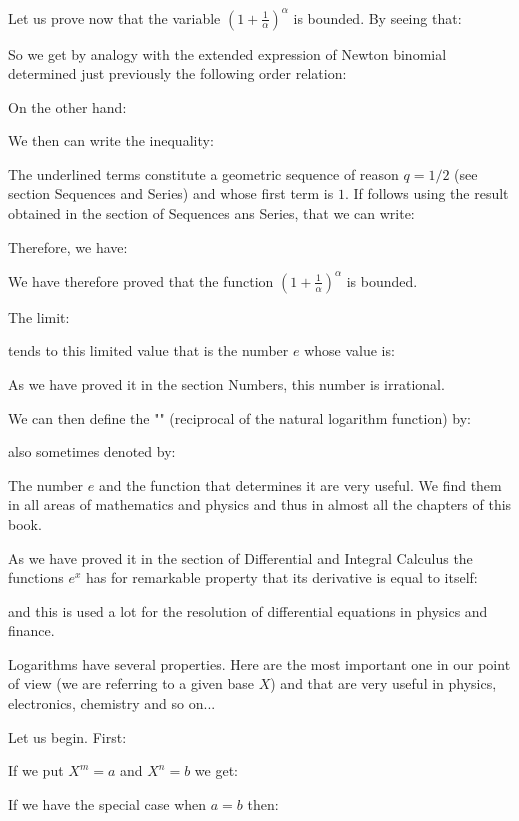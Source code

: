 	Let us prove now that the variable $\left(1+\frac{1}{\alpha}\right)^\alpha$ is bounded. By seeing that:
	
	So we get by analogy with the extended expression of Newton binomial determined just previously the following order relation:
	
	On the other hand:
	
	We then can write the inequality:
	
	The underlined terms constitute a geometric sequence of reason $q=1/2$ (see section Sequences and Series) and whose first term is $1$. If follows using the result obtained in the section of Sequences ans Series, that we can write:
	
	Therefore, we have:
	
	We have therefore proved that the function $\left(1+\frac{1}{\alpha}\right)^\alpha$ is bounded.
	
	The limit:
	
	tends to this limited value that is the number $e$ whose value is:
	
	\begin{tcolorbox}[title=Remark,colframe=black,arc=10pt]
	As we have proved it in the section Numbers, this number is irrational.
	\end{tcolorbox}
	We can then define the "" (reciprocal of the natural logarithm function) by:
	
	also sometimes denoted by:
	
	The number $e$ and the function that determines it are very useful. We find them in all areas of mathematics and physics and thus in almost all the chapters of this book.
	
	As we have proved it in the section of Differential and Integral Calculus the functions $e^x$ has for remarkable property that its derivative is equal to itself:
	
	and this is used a lot for the resolution of differential equations in physics and finance.
	
	Logarithms have several properties. Here are the most important one in our point of view (we are referring to a given base $X$) and that are very useful in physics, electronics, chemistry and so on...
	
	Let us begin. First:
	
	If we put $X^m=a$ and $X^n=b$ we get:
	
	If we have the special case when $a=b$ then:
	
